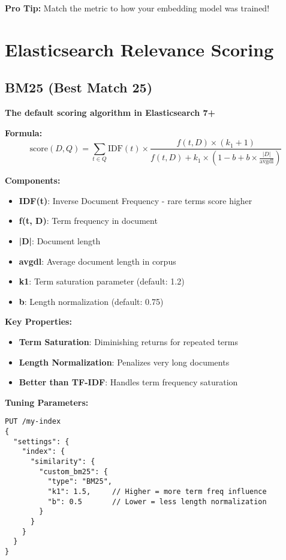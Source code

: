 \documentclass[10pt]{article}
\begin{document}
\textbf{Pro Tip:} Match the metric to how your embedding model was trained!

\section{Elasticsearch Relevance Scoring}

\subsection{BM25 (Best Match 25)}

\textbf{The default scoring algorithm in Elasticsearch 7+}

\textbf{Formula:}
\[
\text{score}(D, Q) = \sum_{t \in Q} \text{IDF}(t) \times \frac{f(t, D) \times (k_1 + 1)}{f(t, D) + k_1 \times (1 - b + b \times \frac{|D|}{\text{avgdl}})}
\]

\textbf{Components:}
\begin{itemize}
\item \textbf{IDF(t)}: Inverse Document Frequency - rare terms score higher
\item \textbf{f(t, D)}: Term frequency in document
\item \textbf{|D|}: Document length
\item \textbf{avgdl}: Average document length in corpus
\item \textbf{k1}: Term saturation parameter (default: 1.2)
\item \textbf{b}: Length normalization (default: 0.75)
\end{itemize}

\textbf{Key Properties:}
\begin{itemize}
\item \textbf{Term Saturation}: Diminishing returns for repeated terms
\item \textbf{Length Normalization}: Penalizes very long documents
\item \textbf{Better than TF-IDF}: Handles term frequency saturation
\end{itemize}

\textbf{Tuning Parameters:}
\begin{lstlisting}
PUT /my-index
{
  "settings": {
    "index": {
      "similarity": {
        "custom_bm25": {
          "type": "BM25",
          "k1": 1.5,     // Higher = more term freq influence
          "b": 0.5       // Lower = less length normalization
        }
      }
    }
  }
}
\end{lstlisting}
\end{document}
